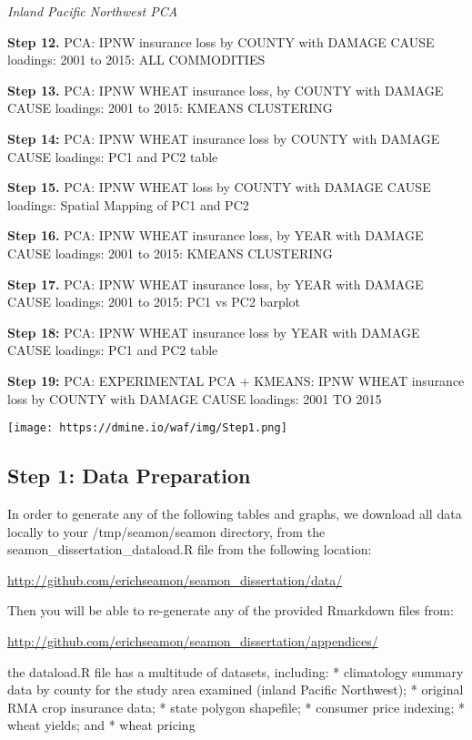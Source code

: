 \documentclass[]{article}
\begin{document}
\emph{Inland Pacific Northwest PCA}

\textbf{Step 12.} PCA: IPNW insurance loss by COUNTY with DAMAGE CAUSE
loadings: 2001 to 2015: ALL COMMODITIES

\textbf{Step 13.} PCA: IPNW WHEAT insurance loss, by COUNTY with DAMAGE
CAUSE loadings: 2001 to 2015: KMEANS CLUSTERING

\textbf{Step 14:} PCA: IPNW WHEAT insurance loss by COUNTY with DAMAGE
CAUSE loadings: PC1 and PC2 table

\textbf{Step 15.} PCA: IPNW WHEAT loss by COUNTY with DAMAGE CAUSE
loadings: Spatial Mapping of PC1 and PC2

\textbf{Step 16.} PCA: IPNW WHEAT insurance loss, by YEAR with DAMAGE
CAUSE loadings: 2001 to 2015: KMEANS CLUSTERING

\textbf{Step 17.} PCA: IPNW WHEAT insurance loss, by YEAR with DAMAGE
CAUSE loadings: 2001 to 2015: PC1 vs PC2 barplot

\textbf{Step 18:} PCA: IPNW WHEAT insurance loss by YEAR with DAMAGE
CAUSE loadings: PC1 and PC2 table

\textbf{Step 19:} PCA: EXPERIMENTAL PCA + KMEANS: IPNW WHEAT insurance
loss by COUNTY with DAMAGE CAUSE loadings: 2001 TO 2015

\texttt{[image: https://dmine.io/waf/img/Step1.png]}

\hypertarget{step-1-data-preparation}{%
\subsection{Step 1: Data Preparation}\label{step-1-data-preparation}}

In order to generate any of the following tables and graphs, we download
all data locally to your /tmp/seamon/seamon directory, from the
seamon\_dissertation\_dataload.R file from the following location:

\url{http://github.com/erichseamon/seamon_dissertation/data/}

Then you will be able to re-generate any of the provided Rmarkdown files
from:

\url{http://github.com/erichseamon/seamon_dissertation/appendices/}

the dataload.R file has a multitude of datasets, including: *
climatology summary data by county for the study area examined (inland
Pacific Northwest); * original RMA crop insurance data; * state polygon
shapefile; * consumer price indexing; * wheat yields; and * wheat
pricing
\end{document}
